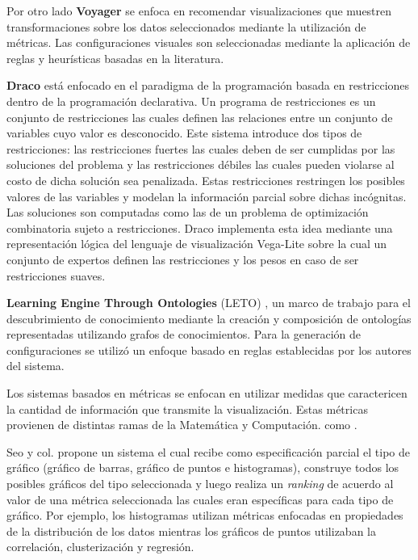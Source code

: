 Por otro lado \textbf{Voyager} \cite{wongsuphasawat2015voyager} se enfoca en recomendar visualizaciones que muestren transformaciones 
sobre los datos seleccionados mediante
la utilizaci\'on de m\'etricas. Las configuraciones visuales son seleccionadas mediante la aplicaci\'on de reglas y heur\'isticas basadas en la literatura. 

\textbf{Draco} \cite{saket2018beyond} est\'a enfocado en el paradigma de la programaci\'on
basada en restricciones dentro de la programaci\'on declarativa. Un programa de restricciones 
es un conjunto de restricciones las cuales definen las relaciones entre un conjunto de variables cuyo
valor es desconocido. Este sistema introduce dos tipos de restricciones: las restricciones fuertes
las cuales deben de ser cumplidas por las soluciones del problema y las restricciones d\'ebiles las cuales
pueden violarse al costo de dicha soluci\'on sea penalizada. Estas restricciones restringen los posibles
valores de las variables y modelan la informaci\'on parcial sobre dichas inc\'ognitas. Las soluciones son
computadas como las de un problema de optimizaci\'on combinatoria sujeto a restricciones. Draco implementa
esta idea mediante una representaci\'on l\'ogica del lenguaje de visualizaci\'on Vega-Lite sobre la
cual un conjunto de expertos definen las restricciones y los pesos en caso de ser restricciones suaves.

\textbf{Learning Engine Through Ontologies} (LETO) \cite{estevez2019demo}, un marco de trabajo para el descubrimiento
de conocimiento mediante la creaci\'on y composici\'on de ontolog\'ias 
representadas utilizando grafos de conocimientos. Para la generaci\'on de configuraciones
se utiliz\'o un enfoque basado en reglas establecidas por los autores del sistema.

Los sistemas basados en m\'etricas se enfocan en utilizar medidas que caractericen la cantidad
de informaci\'on que transmite la visualizaci\'on. Estas m\'etricas provienen de distintas ramas
de la Matem\'atica y Computaci\'on. como .

Seo y col. \cite{seo2004rank} propone un sistema el cual recibe como especificaci\'on parcial el tipo de
gr\'afico (gr\'afico de barras, gr\'afico de puntos e histogramas), construye todos los posibles
gr\'aficos del tipo seleccionada y luego realiza un \textit{ranking} de acuerdo al valor de una m\'etrica seleccionada las
cuales eran espec\'ificas para cada tipo de gr\'afico. Por ejemplo, los histogramas utilizan m\'etricas enfocadas en propiedades
de la distribuci\'on de los datos mientras los gr\'aficos de puntos utilizaban la correlaci\'on, clusterizaci\'on y regresi\'on.

